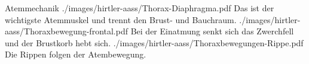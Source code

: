 \begin{PictureSeriesWide}{}{Atemmechanik}
{./images/hirtler-aass/Thorax-Diaphragma.pdf}
{Das  ist der wichtigste Atemmuskel und
trennt den Brust- und Bauchraum. }
{./images/hirtler-aass/Thoraxbewegung-frontal.pdf} {Bei der
Einatmung senkt sich das Zwerchfell und der Brustkorb hebt
sich. }
{./images/hirtler-aass/Thoraxbewegungen-Rippe.pdf}
{Die Rippen folgen der Atembewegung.
}
{}
{}
\end{PictureSeriesWide}





% 


